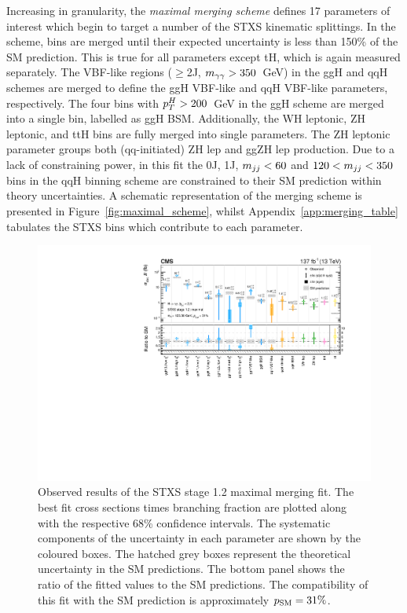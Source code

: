 Increasing in granularity, the \textit{maximal merging scheme} defines 17 parameters of interest which begin to target a number of the STXS kinematic splittings. In the scheme, bins are merged until their expected uncertainty is less than 150\% of the SM prediction. This is true for all parameters except tH, which is again measured separately. The VBF-like regions ($\geq$2J, $m_{\gamma\gamma}>350$~GeV) in the ggH and qqH schemes are merged to define the ggH VBF-like and qqH VBF-like parameters, respectively. The four bins with $p_T^H>200$~GeV in the ggH scheme are merged into a single bin, labelled as ggH BSM. Additionally, the WH leptonic, ZH leptonic, and ttH bins are fully merged into single parameters. The ZH leptonic parameter groups both (qq-initiated) ZH lep and ggZH lep production. Due to a lack of constraining power, in this fit the 0J, 1J, $m_{jj}<60$ and $120<m_{jj}<350$ bins in the qqH binning scheme are constrained to their SM prediction within theory uncertainties. A schematic representation of the merging scheme is presented in Figure~\ref{fig:maximal_scheme}, whilst Appendix~\ref{app:merging_table} tabulates the STXS bins which contribute to each parameter.


\begin{figure}[htb!]
  \centering
  \includegraphics[width=1\textwidth]{Figures/hgg_results/stage1p2_maximal_summary.pdf}
  \caption[Results of the STXS stage 1.2 maximal merging fit]
  {
    Observed results of the STXS stage 1.2 maximal merging fit. The best fit cross sections times branching fraction are plotted along with the respective 68\% confidence intervals. The systematic components of the uncertainty in each parameter are shown by the coloured boxes. The hatched grey boxes represent the theoretical uncertainty in the SM predictions. The bottom panel shows the ratio of the fitted values to the SM predictions. The compatibility of this fit with the SM prediction is approximately $p_{\rm{SM}}=31\%$. 
  }
  \label{fig:stage1p2_maximal_results}
\end{figure}

